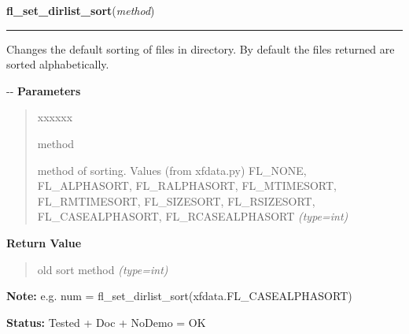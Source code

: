     \label{xformslib:flfilesys:fl_set_dirlist_sort}

    \vspace{0.5ex}

\hspace{.8\funcindent}\begin{boxedminipage}{\funcwidth}

    \raggedright \textbf{fl\_set\_dirlist\_sort}(\textit{method})

    \vspace{-1.5ex}

    \rule{\textwidth}{0.5\fboxrule}
\setlength{\parskip}{2ex}

Changes the default sorting of files in directory. By default the
files returned are sorted alphabetically.

-{}-
\setlength{\parskip}{1ex}
      \textbf{Parameters}
      \vspace{-1ex}

      \begin{quote}
        \begin{Ventry}{xxxxxx}

          \item[method]


method of sorting. Values (from xfdata.py) FL\_NONE, FL\_ALPHASORT,
FL\_RALPHASORT, FL\_MTIMESORT, FL\_RMTIMESORT,  FL\_SIZESORT, FL\_RSIZESORT,
FL\_CASEALPHASORT, FL\_RCASEALPHASORT
            {\it (type=int)}

        \end{Ventry}

      \end{quote}

      \textbf{Return Value}
    \vspace{-1ex}

      \begin{quote}

old sort method
      {\it (type=int)}

      \end{quote}

\textbf{Note:} 
e.g. num = fl\_set\_dirlist\_sort(xfdata.FL\_CASEALPHASORT)


\textbf{Status:} 
Tested + Doc + NoDemo = OK


    \end{boxedminipage}

    \label{xformslib:flfilesys:fl_set_dirlist_filterdir}

